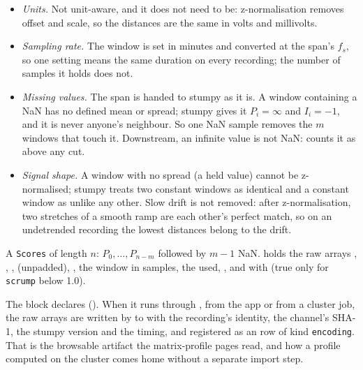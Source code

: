 \begin{itemize}
\item \emph{Units.} Not unit-aware, and it does not need to be: z-normalisation removes offset and
  scale, so the distances are the same in volts and millivolts.
\item \emph{Sampling rate.} The window is set in minutes and converted at the span's $f_s$, so one
  setting means the same duration on every recording; the number of samples it holds does not.
\item \emph{Missing values.} The span is handed to stumpy as it is. A window containing a NaN has
  no defined mean or spread; stumpy gives it $P_i = \infty$ and $I_i = -1$, and it is never anyone's
  neighbour. So one NaN sample removes the $m$ windows that touch it. Downstream, an infinite value
  is not NaN:  counts it as above any cut.
\item \emph{Signal shape.} A window with no spread (a held value) cannot be z-normalised; stumpy
  treats two constant windows as identical and a constant window as unlike any other. Slow drift
  is not removed: after z-normalisation, two stretches of a smooth ramp are each other's perfect
  match, so on an undetrended recording the lowest distances belong to the drift.
\end{itemize}

A \texttt{Scores} of length $n$: $P_0,\dots,P_{n-m}$ followed by $m-1$ NaN.  holds the
raw arrays , , ,  (unpadded), , the window
 in samples, the  used, , and  with
 (true only for \texttt{scrump} below 1.0).

The block declares  (). When it runs through
, from the app or from a cluster job, the raw arrays are
written by  to
 with the
recording's identity, the channel's SHA-1, the stumpy version and the timing, and registered as an
 row of kind \texttt{encoding}. That is the browsable artifact the
matrix-profile pages read, and how a profile computed on the cluster comes home without a separate
import step.

